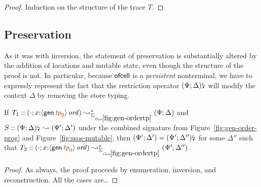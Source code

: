 \begin{proof}
Induction on the structure of the trace $T$. 
\end{proof}





\subsection{Preservation}

As it was with inversion, the statement of preservation is
substantially altered by the addition of locations and mutable state,
even though the structure of the proof is not.  In particular, because
${\sf ofcell}$ is a {\it persistent} nonterminal, we have to expressly
represent the fact that the restriction operator ${(\Psi;
  \Delta)}{\mbox{\lightning}}_{}$ will modify the context $\Delta$ by removing the store
typing.

\bigskip
\begin{theorem}
\label{thm:siggenstate}
If $T_1 :: (\cdot; x{:}\istrue{\susp{{\sf gen}\,\lf{{\it tp}_0}}}) 
   \leadsto^*_{\siggenordertp} 
   (\Psi; \Delta)$ and 
   $S :: {(\Psi; \Delta)}{\mbox{\lightning}}_{} \leadsto (\Psi'; \Delta')$
under the combined signature from Figure~\ref{fig:gen-order-prog}
and Figure~\ref{fig:ssos-mutable}, then
$(\Psi'; \Delta') = {(\Psi'; \Delta'')}{\mbox{\lightning}}_{}$ 
for some $\Delta''$ such that 
$T_2 :: (\cdot; x{:}\istrue{\susp{{\sf gen}\,\lf{{\it tp}_0}}}) 
   \leadsto^*_{\siggenordertp} 
   (\Psi'; \Delta'')$.
\end{theorem}

\begin{proof}
As always, the proof proceeds by enumeration, inversion, and reconstruction. 
All the cases are\ldots 
\end{proof}



